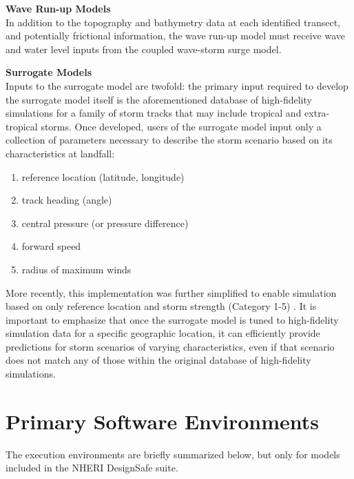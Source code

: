 \noindent\textbf{Wave Run-up Models} \\In addition to the topography and bathymetry data at each identified transect, and potentially frictional information, the wave run-up model must receive wave and water level inputs from the coupled wave-storm surge model.
\newline

\noindent\textbf{Surrogate Models} \\Inputs to the surrogate model are twofold: the primary input required to develop the surrogate model itself is the aforementioned database of high-fidelity simulations for a family of storm tracks that may include tropical and extra-tropical storms. Once developed, users of the surrogate model input only a collection of parameters necessary to describe the storm scenario based on its characteristics at landfall: 

\begin{enumerate}
    \item reference location (latitude, longitude)
    \item track heading (angle)
    \item central pressure (or pressure difference)
    \item forward speed
    \item radius of maximum winds
\end{enumerate}

More recently, this implementation was further simplified to enable simulation based on only reference location and storm strength (Category 1-5) \citep{njcoast2018implementation}. It is important to emphasize that once the surrogate model is tuned to high-fidelity simulation data for a specific geographic location, it can efficiently provide predictions for storm scenarios of varying characteristics, even if that scenario does not match any of those within the original database of high-fidelity simulations. 

\section{Primary Software Environments}
\label{sec:storm_surge_tools}

The execution environments are briefly summarized below, but only for models included in the NHERI DesignSafe suite. 
\newline

